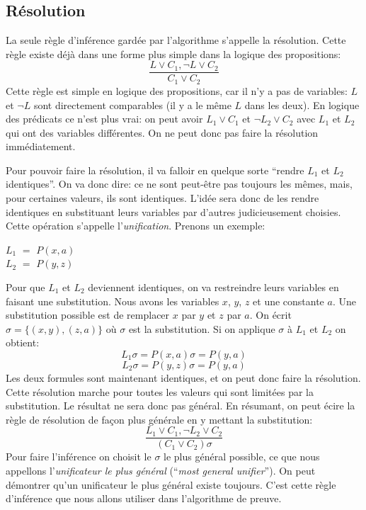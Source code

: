 {\subsection{Résolution}

La seule règle d'inférence gardée par l'algorithme s'appelle la résolution.
Cette règle existe déjà dans une forme plus simple dans la
logique des propositions: $$\frac{L\lor C_1, \neg L \lor C_2}{C_1\lor C_2}$$
Cette règle est simple en logique des propositions, car il n'y a pas de variables: $L$ et $\neg L$ sont directement comparables
(il y a le même $L$ dans les deux).
En logique des prédicats ce n'est plus vrai: on peut avoir $L_1 \lor C_1$ et $\neg L_2 \lor C_2$  avec $L_1$ et $L_2$ qui ont
des variables différentes.
On ne peut donc pas faire la résolution immédiatement.

Pour pouvoir faire la résolution, il va falloir en quelque sorte ``rendre $L_1$ et $L_2$ identiques''.
On va donc dire: ce ne sont peut-être pas toujours les mêmes, mais, pour certaines valeurs, ils sont identiques.
L'idée sera donc de les rendre identiques en substituant leurs variables par d'autres judicieusement choisies.
Cette opération s'appelle l'{\em unification}.
Prenons un exemple:

\begin{minipage}{0.25\textwidth}
		$L_1$ $=$ $P(x,a)$ \\
		$L_2$ $=$ $P(y,z)$
\end{minipage}

Pour que $L_1$ et $L_2$ deviennent identiques, on va restreindre leurs variables en faisant une substitution.
Nous avons les variables $x$, $y$, $z$ et une constante $a$.
Une substitution possible est de remplacer $x$ par $y$ et $z$ par $a$.
On écrit $\sigma = \{(x,y),(z,a)\}$ où $\sigma$ est la substitution.
Si on applique $\sigma$ à $L_1$ et $L_2$ on obtient:
$$L_1 \sigma = P(x,a) \sigma = P(y,a)$$
$$L_2 \sigma = P(y,z) \sigma = P(y,a)$$
Les deux formules sont maintenant identiques, et on peut donc faire la résolution.
Cette résolution marche pour toutes les valeurs qui sont limitées par la substitution.
Le résultat ne sera donc pas général.
En résumant, on peut écire la règle de résolution de façon plus générale en y mettant la substitution:
$$\frac{L_1 \lor C_1, \neg L_2 \lor C_2}{(C_1 \lor C_2)\sigma}$$
Pour faire l'inférence
on choisit le $\sigma$ le plus général possible, ce que nous appellons
l'{\em unificateur le plus général} (``{\em most general unifier}'').
On peut démontrer qu'un unificateur le plus général existe toujours.
C'est cette règle d'inférence que nous allons utiliser dans l'algorithme de preuve.

}
